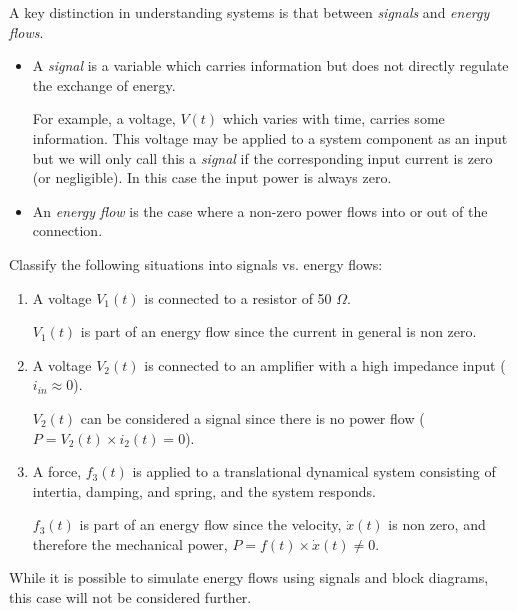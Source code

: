 A key distinction in understanding systems is that between {\it signals} and {\it energy flows}.


\begin{itemize}
  \item  A {\it signal} is a variable which carries information but does not directly regulate the exchange of energy.

For example,  a voltage, $V(t)$ which varies with time, carries some information.   This voltage may be applied to a system component as an input but we will only call this a {\it signal} if the corresponding input current is zero (or negligible).  In this case the input power is always zero.

  \item  An {\it energy flow} is the case where a non-zero power flows into or out of the connection.
\end{itemize}

\begin{ExampleSmall}
Classify the following situations into signals vs. energy flows:

\begin{enumerate}
  \item  A voltage $V_1(t)$ is connected to a resistor of 50 $\Omega$.

  $V_1(t)$  is part of an energy flow since the current in general is non zero.

  \item A voltage $V_2(t)$ is connected to an amplifier with a high impedance input ($i_{in} \approx 0$).

  $V_2(t)$ can be considered a signal since there is no power flow ($P=V_2(t)\times i_2(t) = 0$).


  \item A force, $f_3(t)$ is applied to a translational dynamical system consisting of intertia, damping, and spring, and the system responds.

  $f_3(t)$ is part of an energy flow since the velocity, $\dot{x}(t)$ is non zero, and therefore the mechanical power,
  $P = f(t)\times \dot{x}(t) \neq 0$.

\end{enumerate}

\end{ExampleSmall}


While it is possible to simulate energy flows using signals and block diagrams, this case will not be considered further.



